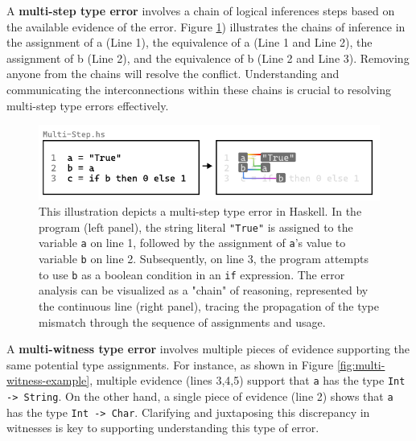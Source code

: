 A \textbf{multi-step type error} involves a chain of logical inferences steps based on the available evidence of the error. Figure \ref{fig:multi-step-example}) illustrates the chains of inference in the assignment of a (Line 1), the equivalence of a (Line 1 and Line 2), the assignment of b (Line 2), and the equivalence of b (Line 2 and Line 3). Removing anyone from the chains will resolve the conflict. Understanding and communicating the interconnections within these chains is crucial to resolving multi-step type errors effectively.

\begin{figure}[htbp]
  \includegraphics[width=\linewidth]{Multi-Step}
  \caption[This illustration depicts a multi-step type error in Haskell]{
    \label{fig:multi-step-example}
    This illustration depicts a multi-step type error in Haskell. In the program (left panel), the string literal \texttt{"True"} is assigned to the variable \texttt{a} on line 1, followed by the assignment of \texttt{a}'s value to variable \texttt{b} on line 2. Subsequently, on line 3, the program attempts to use \texttt{b} as a boolean condition in an \texttt{if} expression. The error analysis can be visualized as a "chain" of reasoning, represented by the continuous line (right panel), tracing the propagation of the type mismatch through the sequence of assignments and usage. }
\end{figure}

A \textbf{multi-witness type error} involves multiple pieces of evidence supporting the same potential type assignments. For instance, as shown in Figure \ref{fig:multi-witness-example}, multiple evidence (lines 3,4,5) support that \texttt{a} has the type \texttt{Int -> String}. On the other hand, a single piece of evidence (line 2) shows that \texttt{a} has the type \texttt{Int -> Char}.  Clarifying and juxtaposing this discrepancy in witnesses is key to supporting understanding this type of error.

